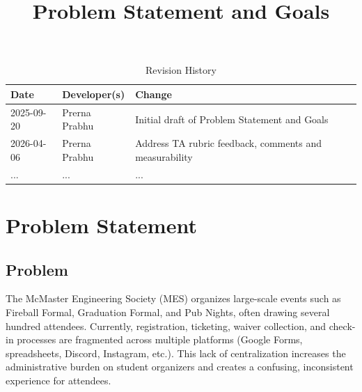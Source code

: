 \documentclass{article}
\title{Problem Statement and Goals\\\progname}
\author{\authname}
\date{}
\begin{document}
\sloppy

\maketitle

\begin{table}[hp]
\caption{Revision History} \label{TblRevisionHistory}
\begin{tabularx}{\textwidth}{llX}
\toprule
\textbf{Date} & \textbf{Developer(s)} & \textbf{Change}\\
\midrule
2025-09-20 & Prerna Prabhu  & Initial draft of Problem Statement and Goals\\
2026-04-06 & Prerna Prabhu & Address TA rubric feedback, comments and measurability\\
... & ... & ...\\
\bottomrule
\end{tabularx}
\end{table}

\section{Problem Statement}

\subsection{Problem}
The McMaster Engineering Society (MES) organizes large-scale events such as Fireball Formal, Graduation Formal,
 and Pub Nights, often drawing several hundred attendees. Currently, registration, ticketing, waiver collection,
 and check-in processes are fragmented across multiple platforms (Google Forms, spreadsheets, Discord, Instagram,
 etc.). This lack of centralization increases the administrative burden on student organizers and creates a
 confusing, inconsistent experience for attendees.\\
\end{document}
